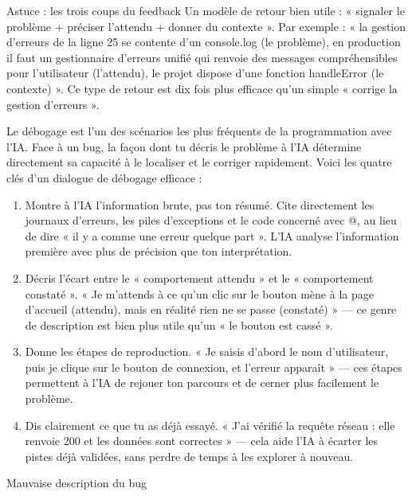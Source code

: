 \begin{tcbinfo}{Astuce : les trois coups du feedback}
Un modèle de retour bien utile : « signaler le problème + préciser l'attendu + donner du contexte ». Par exemple : « la gestion d'erreurs de la ligne 25 se contente d'un console.log (le problème), en production il faut un gestionnaire d'erreurs unifié qui renvoie des messages compréhensibles pour l'utilisateur (l'attendu), le projet dispose d'une fonction handleError (le contexte) ». Ce type de retour est dix fois plus efficace qu'un simple « corrige la gestion d'erreurs ».

\end{tcbinfo}


Le débogage est l'un des scénarios les plus fréquents de la programmation avec l'IA. Face à un bug, la façon dont tu décris le problème à l'IA détermine directement sa capacité à le localiser et le corriger rapidement. Voici les quatre clés d'un dialogue de débogage efficace :

\begin{enumerate}
  \item Montre à l'IA l'information brute, pas ton résumé. Cite directement les journaux d'erreurs, les piles d'exceptions et le code concerné avec @, au lieu de dire « il y a comme une erreur quelque part ». L'IA analyse l'information première avec plus de précision que ton interprétation.
  \item Décris l'écart entre le « comportement attendu » et le « comportement constaté ». « Je m'attends à ce qu'un clic sur le bouton mène à la page d'accueil (attendu), mais en réalité rien ne se passe (constaté) » — ce genre de description est bien plus utile qu'un « le bouton est cassé ».
  \item Donne les étapes de reproduction. « Je saisis d'abord le nom d'utilisateur, puis je clique sur le bouton de connexion, et l'erreur apparaît » — ces étapes permettent à l'IA de rejouer ton parcours et de cerner plus facilement le problème.
  \item Dis clairement ce que tu as déjà essayé. « J'ai vérifié la requête réseau : elle renvoie 200 et les données sont correctes » — cela aide l'IA à écarter les pistes déjà validées, sans perdre de temps à les explorer à nouveau.
\end{enumerate}

Mauvaise description du bug

